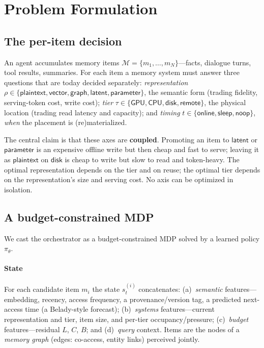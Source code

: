 \section{Problem Formulation}
\label{sec:formulation}

\subsection{The per-item decision}
An agent accumulates memory items $\mathcal{M}=\{m_1,\dots,m_N\}$---facts, dialogue turns, tool results,
summaries. For each item a memory system must answer three questions that are today decided separately:
\emph{representation} $\rho\in\{\textsf{plaintext},\textsf{vector},\textsf{graph},\textsf{latent},
\textsf{parameter}\}$, the semantic form (trading fidelity, serving-token cost, write cost);
\emph{tier} $\tau\in\{\textsf{GPU},\textsf{CPU},\textsf{disk},\textsf{remote}\}$, the physical location
(trading read latency and capacity); and \emph{timing} $t\in\{\textsf{online},\textsf{sleep},\textsf{noop}\}$,
\emph{when} the placement is (re)materialized.

The central claim is that these axes are \textbf{coupled}. Promoting an item to $\textsf{latent}$ or
$\textsf{parameter}$ is an expensive offline write but then cheap and fast to serve; leaving it as
$\textsf{plaintext}$ on $\textsf{disk}$ is cheap to write but slow to read and token-heavy. The optimal
representation depends on the tier and on reuse; the optimal tier depends on the representation's size
and serving cost. No axis can be optimized in isolation.

\subsection{A budget-constrained MDP}
We cast the orchestrator as a budget-constrained MDP solved by a learned policy $\pi_\theta$.

\paragraph{State} For each candidate item $m_i$ the state $s_t^{(i)}$ concatenates: (a)~\emph{semantic}
features---embedding, recency, access frequency, a provenance/version tag, a predicted next-access time
(a Belady-style forecast); (b)~\emph{systems} features---current representation and tier, item size, and
per-tier occupancy/pressure; (c)~\emph{budget} features---residual $L$, $C$, $B$; and (d)~\emph{query}
context. Items are the nodes of a \emph{memory graph} (edges: co-access, entity links) perceived jointly.

